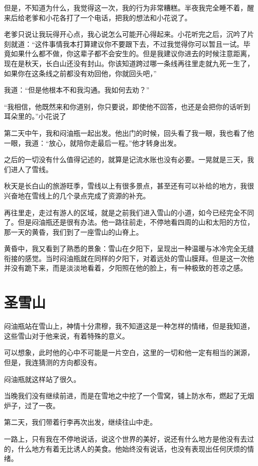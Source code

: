 但是，不知道为什么，我觉得这一次，我的行为非常糟糕。半夜我完全睡不着，醒来后给老爹和小花各打了一个电话，把我的想法和小花说了。

老爹只说让我玩得开心点，我心说怎么可能开心得起来。小花听完之后，沉吟了片刻就道：“这件事情我本打算建议你不要跟下去，不过我觉得你可以暂且一试。毕竟如果什么都不做，你这辈子都不会安生的。但是我建议你进去的时候注意距离，现在是秋天，长白山还没有封山。你该知道跨过哪一条线再往里走就九死一生了，如果你在这条线之前都没有劝回他，你就回头吧，”

我道：“但是他根本不和我沟通。我如何去劝？”

“我相信，他既然来和你道别，你只要说，即使他不回答，也还是会把你的话听到耳朵里的。”小花说了

第二天中午，我和闷油瓶一起出发。他出门的时候，回头看了我一眼，我也看了他一眼，我道：“放心，就陪你走最后一程。”他才转身出发。

之后的一切没有什么值得记述的，就算是记流水账也没有必要。一晃就是三天，我们进人了雪线。

秋天是长白山的旅游旺季，雪线以上有很多景点，甚至还有可以补给的地方，我很兴奋地在雪线上的几个录点完成了资源的补充。

再往里走，走过有游人的区域，就是之前我们进入雪山的小道，如今已经完全不同了。但是闷油瓶还是很有办法。他一路往前走，不停地看四周的山和太阳的方位，那一天的黄昏，我们到了一座雪山的山脊上。

黄昏中，我又看到了熟悉的景象：雪山在夕阳下，呈现出一种温暖与冰冷完全无缝衔接的感觉。当时闷油瓶就在同样的夕阳下，对着远处的雪山膜拜。但是这一次他并没有跪下来，而是淡淡地看着，夕阳照在他的脸上，有一种极致的苍凉之感。

\chapter{圣雪山}

闷油瓶站在雪山上，神情十分肃穆，我不知道这是一种怎样的情绪，但是我知道，这些雪山对于他来说，有着特殊的意义。

可以想象，此时他的心中不可能是一片空白，这里的一切和他一定有相当的渊源，但是，我连猜测的方向都没有。

闷油瓶就这样站了很久。

当晚我们没有继续前进，而是在雪地之中挖了一个雪窝，铺上防水布，燃起了无烟炉子，过了一夜。

第二天，我们带着行李再次出发，继续往山中走。

一路上，只有我在不停地说话，说这个世界的美好，说还有什么地方是他没有去过的，什么地方有着无比诱人的美食。他始终没有说话，也没有表现出任何厌烦的情绪。

